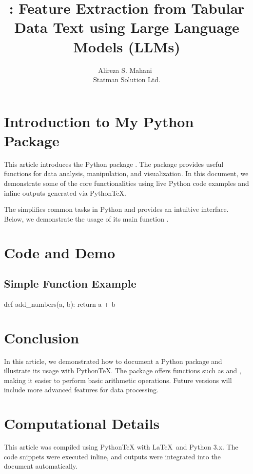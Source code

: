 \documentclass[article]{jss}
\author{Alireza S. Mahani~\orcidlink{0000-0002-7932-6681}\\Statman Solution Ltd.}
\title{\pkg{TabuLLM}: Feature Extraction from Tabular Data Text using Large Language Models (LLMs)}
\begin{document}
\section[Introduction to My Python Package]{Introduction to My Python Package} \label{sec:intro}

\begin{leftbar}
This article introduces the Python package . The package provides 
useful functions for data analysis, manipulation, and visualization. In this 
document, we demonstrate some of the core functionalities using live Python 
code examples and inline outputs generated via PythonTeX.
\end{leftbar}

The  simplifies common tasks in Python and provides an 
intuitive interface. Below, we demonstrate the usage of its main function 
.

\section{Code and Demo} \label{sec:code-demo}

\subsection{Simple Function Example}

\begin{pyverbatim}
def add_numbers(a, b):
    return a + b
\end{pyverbatim}


\section{Conclusion} \label{sec:conclusion}

In this article, we demonstrated how to document a Python package and 
illustrate its usage with PythonTeX. The package  offers 
functions such as  and , making 
it easier to perform basic arithmetic operations. Future versions will include 
more advanced features for data processing.

\section*{Computational Details}

This article was compiled using PythonTeX with \LaTeX\ and Python 3.x. 
The code snippets were executed inline, and outputs were integrated into 
the document automatically.
\end{document}
